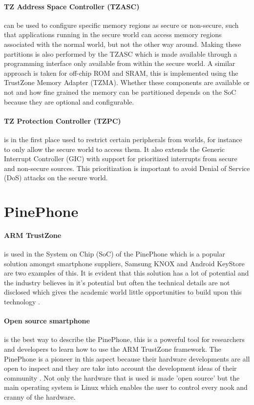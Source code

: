 \paragraph*{TZ Address Space Controller (TZASC)}
can be used to configure specific memory regions as secure or non-secure, such that applications running in the secure world can access memory regions associated with the normal world, but not the other way around. Making these partitions is also performed by the TZASC which is made available through a programming interface only available from within the secure world. A similar approach is taken for off-chip ROM and SRAM, this is implemented using the TrustZone Memory Adapter (TZMA). Whether these components are available or not and how fine grained the memory can be partitioned depends on the SoC because they are optional and configurable.

\paragraph*{TZ Protection Controller (TZPC)}
is in the first place used to restrict certain peripherals from worlds, for instance to only allow the secure world to access them.
It also extends the Generic Interrupt Controller (GIC) with support for prioritized interrupts from secure and non-secure sources. This prioritization is important to avoid Denial of Service (DoS) attacks on the secure world.  

\section{PinePhone}

\paragraph*{ARM TrustZone}
is used in the System on Chip (SoC) of the PinePhone which is a popular solution amongst smartphone suppliers, Samsung KNOX \cite{KNOX} and Android KeyStore \cite{KeyStore} are two examples of this. It is evident that this solution has a lot of potential and the industry believes in it's potential but often the technical details are not disclosed which gives the academic world little opportunities to build upon this technology \cite{PintoSandro2019DATA}.

\paragraph*{Open source smartphone} 
is the best way to describe the PinePhone, this is a powerful tool for researchers and developers to learn how to use the ARM TrustZone framework. The PinePhone is a pioneer in this aspect because their hardware developments are all open to inspect and they are take into account the development ideas of their community \cite{PinePhone}. Not only the hardware that is used is made 'open source' but the main operating system is Linux \cite{PineSoft} which enables the user to control every nook and cranny of the hardware. 


